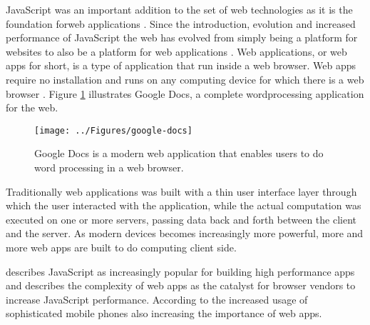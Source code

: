 JavaScript was an important addition to the set of web technologies as it is the foundation forweb applications \parencite{ParkJungMoon2015}. Since the introduction, evolution and increased performance of JavaScript the web has evolved from simply being a platform for websites to also be a platform for web applications \parencite{SandhuHerreraHendren2018}. Web applications, or web apps for short, is a type of application that run inside a web browser. Web apps require no installation and runs on any computing device for which there is a web browser \parencite{RatanaworabhanLivshitsZorn2010}. Figure \ref{google-docs} illustrates Google Docs, a complete wordprocessing application for the web.

\begin{figure}[!h]
\centering
\texttt{[image: ../Figures/google-docs]}
\caption{Google Docs is a modern web application that enables users to do word processing in a web browser.}
\label{google-docs}
\end{figure}

Traditionally web applications was built with a thin user interface layer through which the user interacted with the application, while the actual computation was executed on one or more servers, %
passing data back and forth between the client and the server. As modern devices becomes increasingly more powerful, more and more web apps are built to do computing client side.

\textcite{SandhuHerreraHendren2018} describes JavaScript as increasingly popular for building high performance apps and \textcite{RatanaworabhanLivshitsZorn2010} describes the complexity of web apps as the catalyst for browser vendors to increase JavaScript performance. According to \textcite{RatanaworabhanLivshitsZorn2010} the increased usage of sophisticated mobile phones also increasing the importance of web apps.
